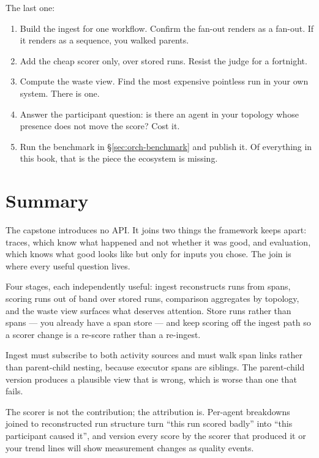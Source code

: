 \begin{exercisebox}
The last one:

\begin{enumerate}[leftmargin=1.4em]
\item Build the ingest for one workflow. Confirm the fan-out renders as a
      fan-out. If it renders as a sequence, you walked parents.
\item Add the cheap scorer only, over stored runs. Resist the judge for a
      fortnight.
\item Compute the waste view. Find the most expensive pointless run in your own
      system. There is one.
\item Answer the participant question: is there an agent in your topology whose
      presence does not move the score? Cost it.
\item Run the benchmark in \S\ref{sec:orch-benchmark} and publish it. Of
      everything in this book, that is the piece the ecosystem is missing.
\end{enumerate}
\end{exercisebox}

\section{Summary}

The capstone introduces no API. It joins two things the framework keeps apart:
traces, which know what happened and not whether it was good, and evaluation,
which knows what good looks like but only for inputs you chose. The join is where
every useful question lives.

Four stages, each independently useful: ingest reconstructs runs from spans,
scoring runs out of band over stored runs, comparison aggregates by topology, and
the waste view surfaces what deserves attention. Store runs rather than spans ---
you already have a span store --- and keep scoring off the ingest path so a
scorer change is a re-score rather than a re-ingest.

Ingest must subscribe to both activity sources and must walk span links rather
than parent-child nesting, because executor spans are siblings. The parent-child
version produces a plausible view that is wrong, which is worse than one that
fails.

The scorer is not the contribution; the attribution is. Per-agent breakdowns
joined to reconstructed run structure turn ``this run scored badly'' into ``this
participant caused it'', and version every score by the scorer that produced it
or your trend lines will show measurement changes as quality events.

